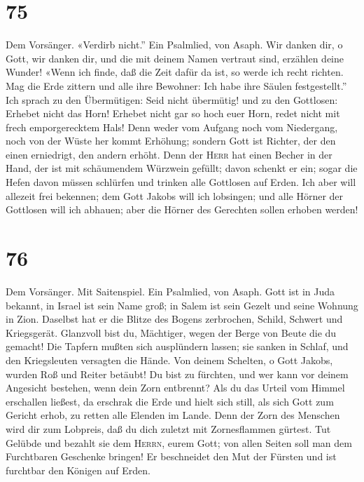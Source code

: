\hypertarget{section-74}{%
\section{75}\label{section-74}}

 Dem Vorsänger. «Verdirb nicht.'' Ein Psalmlied, von
Asaph. Wir danken dir, o Gott, wir danken dir, und die mit deinem Namen
vertraut sind, erzählen deine Wunder!  «Wenn ich finde,
daß die Zeit dafür da ist, so werde ich recht richten. 
Mag die Erde zittern und alle ihre Bewohner: Ich habe ihre Säulen
festgestellt.''  Ich sprach zu den Übermütigen: Seid nicht
übermütig! und zu den Gottlosen: Erhebet nicht das Horn! 
Erhebet nicht gar so hoch euer Horn, redet nicht mit frech
emporgerecktem Hals!  Denn weder vom Aufgang noch vom
Niedergang, noch von der Wüste her kommt Erhöhung; 
sondern Gott ist Richter, der den einen erniedrigt, den andern erhöht.
 Denn der \textsc{Herr} hat einen Becher in der Hand, der
ist mit schäumendem Würzwein gefüllt; davon schenkt er ein; sogar die
Hefen davon müssen schlürfen und trinken alle Gottlosen auf Erden.
 Ich aber will allezeit frei bekennen; dem Gott Jakobs
will ich lobsingen;  und alle Hörner der Gottlosen will
ich abhauen; aber die Hörner des Gerechten sollen erhoben werden!

\hypertarget{section-75}{%
\section{76}\label{section-75}}

 Dem Vorsänger. Mit Saitenspiel. Ein Psalmlied, von Asaph.
Gott ist in Juda bekannt, in Israel ist sein Name groß; 
in Salem ist sein Gezelt und seine Wohnung in Zion. 
Daselbst hat er die Blitze des Bogens zerbrochen, Schild, Schwert und
Kriegsgerät.  Glanzvoll bist du, Mächtiger, wegen der
Berge von Beute die du gemacht!  Die Tapfern mußten sich
ausplündern lassen; sie sanken in Schlaf, und den Kriegsleuten versagten
die Hände.  Von deinem Schelten, o Gott Jakobs, wurden Roß
und Reiter betäubt!  Du bist zu fürchten, und wer kann vor
deinem Angesicht bestehen, wenn dein Zorn entbrennt?  Als
du das Urteil vom Himmel erschallen ließest, da erschrak die Erde und
hielt sich still,  als sich Gott zum Gericht erhob, zu
retten alle Elenden im Lande.  Denn der Zorn des Menschen
wird dir zum Lobpreis, daß du dich zuletzt mit Zornesflammen gürtest.
 Tut Gelübde und bezahlt sie dem \textsc{Herrn}, eurem
Gott; von allen Seiten soll man dem Furchtbaren Geschenke bringen!
 Er beschneidet den Mut der Fürsten und ist furchtbar den
Königen auf Erden.

